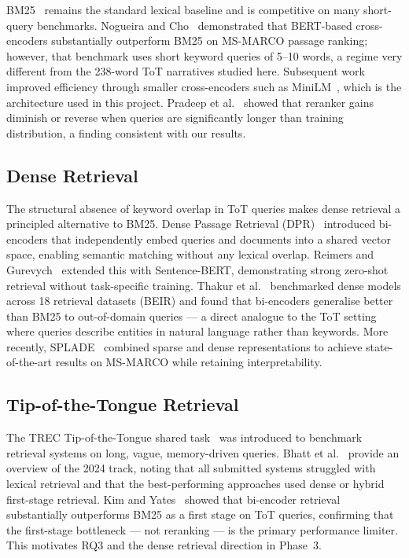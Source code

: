 \documentclass[conference]{IEEEtran}
\begin{document}
BM25~\cite{bm25} remains the standard lexical baseline and is competitive
on many short-query benchmarks.
Nogueira and Cho~\cite{nogueira2019} demonstrated that BERT-based
cross-encoders substantially outperform BM25 on MS-MARCO passage ranking;
however, that benchmark uses short keyword queries of 5--10 words, a regime
very different from the 238-word ToT narratives studied here.
Subsequent work improved efficiency through smaller cross-encoders such
as MiniLM~\cite{wang2020}, which is the architecture used in this project.
Pradeep et al.~\cite{pradeep2022} showed that reranker gains diminish or
reverse when queries are significantly longer than training distribution,
a finding consistent with our results.

\subsection{Dense Retrieval}

The structural absence of keyword overlap in ToT queries makes dense
retrieval a principled alternative to BM25.
Dense Passage Retrieval (DPR)~\cite{karpukhin2020} introduced bi-encoders
that independently embed queries and documents into a shared vector space,
enabling semantic matching without any lexical overlap.
Reimers and Gurevych~\cite{reimers2019} extended this with Sentence-BERT,
demonstrating strong zero-shot retrieval without task-specific training.
Thakur et al.~\cite{thakur2021} benchmarked dense models across 18 retrieval
datasets (BEIR) and found that bi-encoders generalise better than BM25 to
out-of-domain queries — a direct analogue to the ToT setting where queries
describe entities in natural language rather than keywords.
More recently, SPLADE~\cite{formal2021} combined sparse and dense
representations to achieve state-of-the-art results on MS-MARCO while
retaining interpretability.

\subsection{Tip-of-the-Tongue Retrieval}

The TREC Tip-of-the-Tongue shared task~\cite{trec-tot} was introduced to
benchmark retrieval systems on long, vague, memory-driven queries.
Bhatt et al.~\cite{bhatt2024} provide an overview of the 2024 track,
noting that all submitted systems struggled with lexical retrieval and that
the best-performing approaches used dense or hybrid first-stage retrieval.
Kim and Yates~\cite{tot-dense} showed that bi-encoder retrieval substantially
outperforms BM25 as a first stage on ToT queries, confirming that the
first-stage bottleneck — not reranking — is the primary performance limiter.
This motivates RQ3 and the dense retrieval direction in Phase~3.
\end{document}
